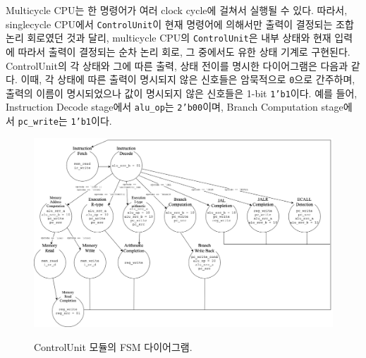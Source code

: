 \documentclass[openright, a4paper]{article}
\newcommand{\code}[1]{\texttt{#1}}
\begin{document}
\hfill

Multicycle CPU는 한 명령어가 여러 clock cycle에 걸쳐서 실행될 수 있다. 따라서,
singlecycle CPU에서 \code{ControlUnit}이 현재 명령어에 의해서만 출력이 결정되는
조합 논리 회로였던 것과 달리, multicycle CPU의 \code{ControlUnit}은 내부 상태와
현재 입력에 따라서 출력이 결정되는 순차 논리 회로, 그 중에서도 유한 상태 기계로
구현된다. ControlUnit의 각 상태와 그에 따른 출력, 상태 전이를 명시한
다이어그램은 다음과 같다. 이때, 각 상태에 따른 출력이 명시되지 않은 신호들은
암묵적으로 \code{0}으로 간주하며, 출력의 이름이 명시되었으나 값이 명시되지 않은
신호들은 1-bit \code{1'b1}이다. 예를 들어, Instruction Decode stage에서
\code{alu_op}는 \code{2'b00}이며, Branch Computation stage에서 \code{pc_write}는
\code{1'b1}이다.

{
    \begin{figure}[!h]
        \centering
        \includegraphics[width=\textwidth]{multicycle-fsm.png}
        \label{fig:design}
        \caption{ControlUnit 모듈의 FSM 다이어그램.}
    \end{figure}
}
\end{document}
